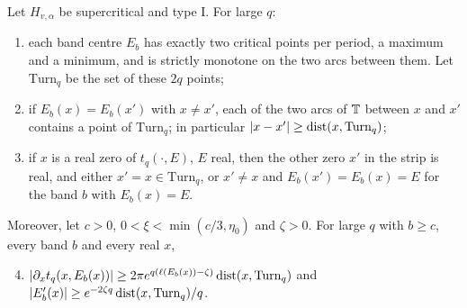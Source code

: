 \begin{lemma}\label{lem:tI-curves}
Let $H_{v,\alpha}$ be supercritical and type I. For large $q$:
\begin{enumerate}
\item each band centre $E_b$ has exactly two critical points per period, a maximum and a minimum, and is strictly monotone on the two arcs between them. Let $\mathrm{Turn}_q$ be the set of these $2q$ points;
\item if $E_b(x)=E_b(x')$ with $x\ne x'$, each of the two arcs of $\mathbb T$ between $x$ and $x'$ contains a point of $\mathrm{Turn}_q$; in particular $|x-x'|\ge\operatorname{dist}(x,\mathrm{Turn}_q)$;
\item if $x$ is a real zero of $t_q(\cdot,E)$, $E$ real, then the other zero $x'$ in the strip is real, and either $x'=x\in\mathrm{Turn}_q$, or $x'\ne x$ and $E_b(x')=E_b(x)=E$ for the band $b$ with $E_b(x)=E$.
\end{enumerate}
Moreover, let $c>0$, $0<\xi<\min(c/3,\eta_0)$ and $\zeta>0$. For large $q$ with $b\ge c$, every band $b$ and every real $x$,
\begin{enumerate}
\setcounter{enumi}{3}
\item $|\partial_xt_q(x,E_b(x))|\ge2\pi e^{q(\ell(E_b(x))-\zeta)}\operatorname{dist}(x,\mathrm{Turn}_q)$ and $|E_b'(x)|\ge e^{-2\zeta q}\operatorname{dist}(x,\mathrm{Turn}_q)/q$.
\end{enumerate}
\end{lemma}

